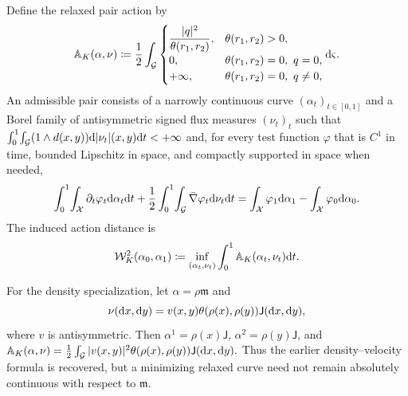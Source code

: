 \begin{defn}\label{def-continuum-nonlocal-wasserstein}
Define the relaxed pair action by
\begin{equation}\label{eq-nonlocal-relaxed-action}
\mathbb A_K(\alpha,\nu)
\coloneqq
\frac12\int_{\mathcal G}
\begin{cases}
\displaystyle\frac{|q|^2}{\theta(r_1,r_2)},&\theta(r_1,r_2)>0,\\[.35em]
0,&\theta(r_1,r_2)=0,\ q=0,\\
+\infty,&\theta(r_1,r_2)=0,\ q\neq0,
\end{cases}
\mathrm{d}\varsigma.
\end{equation}
An admissible pair consists of a narrowly continuous curve $(\alpha_t)_{t\in[0,1]}$ and a Borel family of antisymmetric signed flux measures $(\nu_t)_t$ such that
\(\int_0^1\!\int_{\mathcal G}(1\wedge d(x,y))\mathrm{d}|\nu_t|(x,y)\mathrm{d} t<+\infty\)
and, for every test function $\varphi$ that is $C^1$ in time, bounded Lipschitz in space, and compactly supported in space when needed,
\begin{equation}\label{eq-nonlocal-continuity-weak}
\int_0^1\!\int_{\mathcal X}\partial_t\varphi_t\mathrm{d}\alpha_t\mathrm{d} t
+\frac12\int_0^1\!\int_{\mathcal G}\bar\nabla\varphi_t\mathrm{d}\nu_t\mathrm{d} t
=
\int_{\mathcal X}\varphi_1\mathrm{d}\alpha_1-
\int_{\mathcal X}\varphi_0\mathrm{d}\alpha_0.
\end{equation}
The induced action distance is
\begin{equation}\label{eq-nonlocal-wasserstein-distance}
\mathcal W_K^2(\alpha_0,\alpha_1)
\coloneqq
\inf_{(\alpha_t,\nu_t)}\int_0^1\mathbb A_K(\alpha_t,\nu_t)\mathrm{d} t.
\end{equation}
\end{defn}
For the density specialization, let $\alpha=\rho\mathfrak m$ and
\begin{equation}\label{eq-nonlocal-density-flux}
\nu(\mathrm{d} x,\mathrm{d} y)
=
v(x,y)\theta(\rho(x),\rho(y))\mathsf J(\mathrm{d} x,\mathrm{d} y),
\end{equation}
where $v$ is antisymmetric. Then $\alpha^1=\rho(x)\mathsf J$, $\alpha^2=\rho(y)\mathsf J$, and
\(\mathbb A_K(\alpha,\nu) = \frac12\int_{\mathcal G}|v(x,y)|^2\theta(\rho(x),\rho(y))\mathsf J(\mathrm{d} x,\mathrm{d} y).\)
Thus the earlier density--velocity formula is recovered, but a minimizing relaxed curve need not remain absolutely continuous with respect to $\mathfrak m$.

